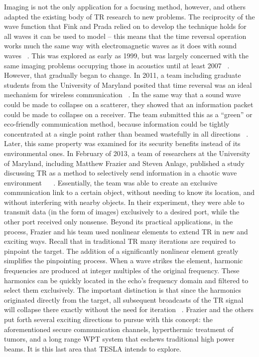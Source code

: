 Imaging is not the only application for a focusing method, however, and others adapted the existing body of TR research to new problems. The reciprocity of the wave function that Fink and Prada relied on to develop the technique holds for all waves it can be used to model – this means that the time reversal operation works much the same way with electromagnetic waves as it does with sound waves ~\cite{chambers_target_2007}. This was explored as early as 1999, but was largely concerned with the same imaging problems occupying those in acoustics until at least 2007 ~\cite{chambers_target_2007}. However, that gradually began to change. In 2011, a team including graduate students from the University of Maryland posited that time reversal was an ideal mechanism for wireless communication ~\cite{giler_demo_2009}. In the same way that a sound wave could be made to collapse on a scatterer, they showed that an information packet could be made to collapse on a receiver. The team submitted this as a “green” or eco-friendly communication method, because information could be tightly concentrated at a single point rather than beamed wastefully in all directions ~\cite{giler_demo_2009}. Later, this same property was examined for its security benefits instead of its environmental ones. In February of 2013, a team of researchers at the University of Maryland, including Matthew Frazier and Steven Anlage, published a study discussing TR as a method to selectively send information in a chaotic wave environment ~\cite{nltr-wave-chaotic} ~\cite{taddese_sensing_2010}. Essentially, the team was able to create an exclusive communication link to a certain object, without needing to know its location, and without interfering with nearby objects. In their experiment, they were able to transmit data (in the form of images) exclusively to a desired  port, while the other port received only nonsense.
Beyond its practical applications, in the process, Frazier and his team used nonlinear elements to extend TR in new and exciting ways. Recall that in traditional TR many iterations are required to pinpoint the target. The addition of a significantly nonlinear element greatly simplifies the pinpointing process. When a wave strikes the element, harmonic frequencies are produced at integer multiples of the original frequency. These harmonics can be quickly located in the echo’s frequency domain and filtered to select them exclusively. The important distinction is that since the harmonics originated directly from the target, all subsequent broadcasts of the TR signal will collapse there exactly without the need for iteration ~\cite{nltr-wave-chaotic}. Frazier and the others put forth several exciting directions to pursue with this concept: the aforementioned secure communication channels, hyperthermic treatment of tumors, and a long range WPT system that eschews traditional high power beams. It is this last area that TESLA intends to explore.


